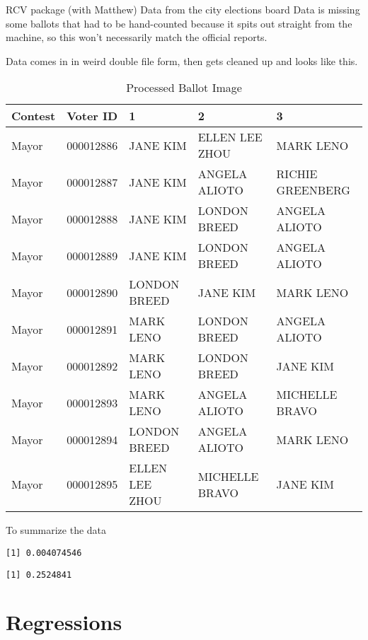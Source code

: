 \documentclass[12pt,twoside]{reedthesis}
\theoremstyle{definition}
\theoremstyle{definition}
\theoremstyle{definition}
\theoremstyle{remark}
\begin{document}
RCV package (with Matthew) Data from the city elections board Data is
missing some ballots that had to be hand-counted because it spits out
straight from the machine, so this won't necessarily match the official
reports.

Data comes in in weird double file form, then gets cleaned up and looks
like this.
\begin{longtable}[t]{lllll}
\caption{\label{tab:unnamed-chunk-10}Processed Ballot Image}\\
\toprule
Contest & Voter ID & 1 & 2 & 3\\
\midrule
Mayor & 000012886 & JANE KIM & ELLEN LEE ZHOU & MARK LENO\\
Mayor & 000012887 & JANE KIM & ANGELA ALIOTO & RICHIE GREENBERG\\
Mayor & 000012888 & JANE KIM & LONDON BREED & ANGELA ALIOTO\\
Mayor & 000012889 & JANE KIM & LONDON BREED & ANGELA ALIOTO\\
Mayor & 000012890 & LONDON BREED & JANE KIM & MARK LENO\\
\addlinespace
Mayor & 000012891 & MARK LENO & LONDON BREED & ANGELA ALIOTO\\
Mayor & 000012892 & MARK LENO & LONDON BREED & JANE KIM\\
Mayor & 000012893 & MARK LENO & ANGELA ALIOTO & MICHELLE BRAVO\\
Mayor & 000012894 & LONDON BREED & ANGELA ALIOTO & MARK LENO\\
Mayor & 000012895 & ELLEN LEE ZHOU & MICHELLE BRAVO & JANE KIM\\
\bottomrule
\end{longtable}
To summarize the data
\begin{verbatim}
[1] 0.004074546
\end{verbatim}
\begin{verbatim}
[1] 0.2524841
\end{verbatim}
\hypertarget{regressions}{%
\section{Regressions}\label{regressions}}
\end{document}
